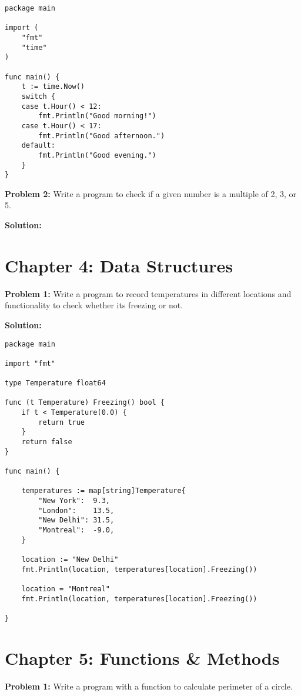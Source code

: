 \begin{lstlisting}[numbers=none]
package main

import (
    "fmt"
    "time"
)

func main() {
    t := time.Now()
    switch {
    case t.Hour() < 12:
        fmt.Println("Good morning!")
    case t.Hour() < 17:
        fmt.Println("Good afternoon.")
    default:
        fmt.Println("Good evening.")
    }
}
\end{lstlisting}

\textbf{Problem 2:} Write a program to check if a given number is a multiple of 2, 3, or 5.

\textbf{Solution:}



\section*{Chapter 4: Data Structures}

\textbf{Problem 1:} Write a program to record temperatures
in different locations and functionality to check whether its freezing or not.

\textbf{Solution:}

\begin{lstlisting}[numbers=none]
package main

import "fmt"

type Temperature float64

func (t Temperature) Freezing() bool {
    if t < Temperature(0.0) {
        return true
    }
    return false
}

func main() {

    temperatures := map[string]Temperature{
        "New York":  9.3,
        "London":    13.5,
        "New Delhi": 31.5,
        "Montreal":  -9.0,
    }

    location := "New Delhi"
    fmt.Println(location, temperatures[location].Freezing())

    location = "Montreal"
    fmt.Println(location, temperatures[location].Freezing())

}
\end{lstlisting}

\section*{Chapter 5: Functions \& Methods}

\textbf{Problem 1:} Write a program with a function to calculate perimeter of a circle.

